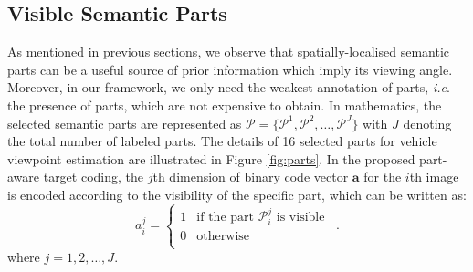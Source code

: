 \documentclass{tutmscthesis}[2010/09/22]
\numberwithin{equation}{section}
\numberwithin{table}{section}
\numberwithin{figure}{section}
\renewcommand{\vec}[1]{\bm{#1}}
\def\onedot{. }
\def\ie{\emph{i.e}\onedot} \def\Ie{\emph{I.e}\onedot}
\begin{document}
\subsection{Visible Semantic Parts}
\label{sec:visible_parts}
As mentioned in previous sections, we observe that spatially-localised semantic parts can be a useful source of prior information which imply its viewing angle.
Moreover, in our framework, we only need the weakest annotation of parts, \ie the presence of parts, which are not expensive to obtain. 
In mathematics, the selected semantic parts are represented as
$\mathcal{P} = \{\mathcal{P}^1, \mathcal{P}^2, \ldots, \mathcal{P}^J\}$
with $J$ denoting the total number of labeled parts. The details of 16 selected parts for vehicle viewpoint estimation are illustrated in Figure \ref{fig:parts}.
In the proposed part-aware target coding, the $j$th dimension of binary code vector $\vec{a}$ for the $i$th image is encoded according to the visibility of the specific part, which can be written as:
\begin{equation}
{a}_i^j =  \left\{ \begin{array}{ll}
1 & \textrm{if the part $\mathcal{P}_i^j$ is visible}\\
0 & \textrm{otherwise}\\
\end{array} \right. \enspace .
\end{equation}
where $j=1, 2, \ldots, J$.
\end{document}
